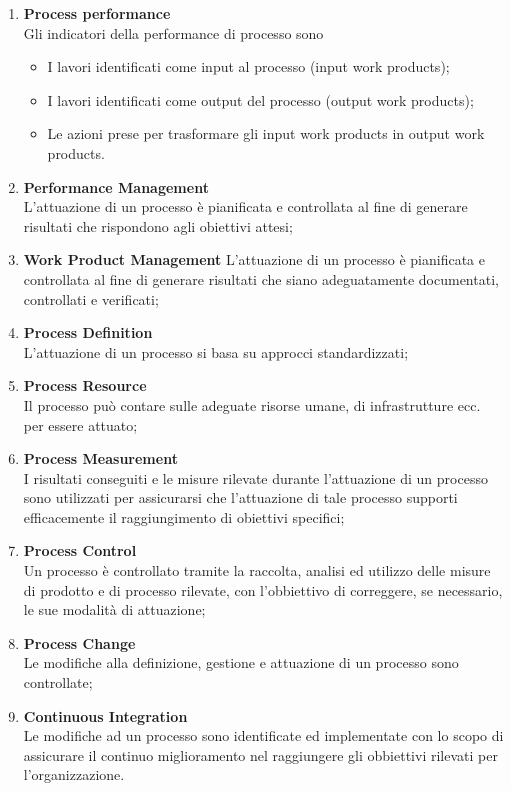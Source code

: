 \begin{enumerate}
\item \textbf{Process performance}\\
Gli indicatori della performance di processo sono
\begin{itemize} 
\item I lavori identificati come input al processo (input work products);
\item I lavori identificati come output del processo (output work products);
\item Le azioni prese per trasformare gli input work products in output work products.
\end{itemize}

\item \textbf{Performance Management}\\
L’attuazione di un processo è pianificata e controllata al fine di generare risultati che rispondono agli obiettivi attesi;
\item \textbf{Work Product Management}
L’attuazione di un processo è pianificata e controllata al fine di generare risultati che siano adeguatamente documentati, controllati e verificati;
\item \textbf{Process Definition}\\
L’attuazione di un processo si basa su approcci standardizzati;
\item \textbf{Process Resource}\\
Il processo può contare sulle adeguate risorse umane, di infrastrutture ecc. per essere attuato;
\item \textbf{Process Measurement}\\
I risultati conseguiti e le misure rilevate durante l’attuazione di un processo sono utilizzati per assicurarsi che l’attuazione di tale processo supporti efficacemente il raggiungimento di obiettivi specifici;
\item \textbf{Process Control}\\
Un processo è controllato tramite la raccolta, analisi ed utilizzo delle misure di prodotto e di processo rilevate, con l’obbiettivo di correggere, se necessario, le sue modalità di attuazione;
\item \textbf{Process Change}\\
Le modifiche alla definizione, gestione e attuazione di un processo sono controllate;
\item \textbf{Continuous Integration}\\
Le modifiche ad un processo sono identificate ed implementate con lo scopo di assicurare il continuo miglioramento nel raggiungere gli obbiettivi rilevati per l’organizzazione.
\end{enumerate}	
